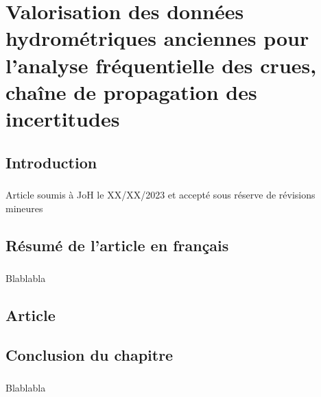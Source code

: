 \chapter{Valorisation des données hydrométriques anciennes pour l’analyse fréquentielle des crues, chaîne de propagation des incertitudes}


\section{Introduction}

\paragraph{} Article soumis à JoH le XX/XX/2023 et accepté sous réserve de révisions mineures

\newpage

\section{Résumé de l'article en français}
	\paragraph{} Blablabla
	
\section{Article}




\section{Conclusion du chapitre}

	\paragraph{} Blablabla